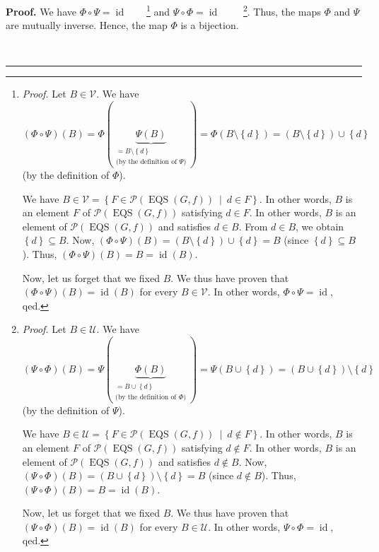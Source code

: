 \documentclass[numbers=enddot,12pt,final,onecolumn,notitlepage]{scrartcl}%
\theoremstyle{definition}
\newenvironment{proof}[1][Proof]{\noindent\textbf{#1.} }{\ \rule{0.5em}{0.5em}}
\newenvironment{verlong}{}{}
\begin{document}
\begin{proof}
\begin{verlong}
We have $\Phi\circ\Psi=\operatorname*{id}$\ \ \ \ \footnote{\textit{Proof.}
Let $B\in\mathcal{V}$. We have%
\[
\left(  \Phi\circ\Psi\right)  \left(  B\right)  =\Phi\left(  \underbrace{\Psi
\left(  B\right)  }_{\substack{=B\setminus\left\{  d\right\}  \\\text{(by the
definition of }\Psi\text{)}}}\right)  =\Phi\left(  B\setminus\left\{
d\right\}  \right)  =\left(  B\setminus\left\{  d\right\}  \right)
\cup\left\{  d\right\}
\]
(by the definition of $\Phi$).
\par
We have $B\in\mathcal{V}=\left\{  F\in\mathcal{P}\left(  \operatorname*{EQS}%
\left(  G,f\right)  \right)  \ \mid\ d\in F\right\}  $. In other words, $B$ is
an element $F$ of $\mathcal{P}\left(  \operatorname*{EQS}\left(  G,f\right)
\right)  $ satisfying $d\in F$. In other words, $B$ is an element of
$\mathcal{P}\left(  \operatorname*{EQS}\left(  G,f\right)  \right)  $ and
satisfies $d\in B$. From $d\in B$, we obtain $\left\{  d\right\}  \subseteq
B$. Now, $\left(  \Phi\circ\Psi\right)  \left(  B\right)  =\left(
B\setminus\left\{  d\right\}  \right)  \cup\left\{  d\right\}  =B$ (since
$\left\{  d\right\}  \subseteq B$). Thus, $\left(  \Phi\circ\Psi\right)
\left(  B\right)  =B=\operatorname*{id}\left(  B\right)  $.
\par
Now, let us forget that we fixed $B$. We thus have proven that $\left(
\Phi\circ\Psi\right)  \left(  B\right)  =\operatorname*{id}\left(  B\right)  $
for every $B\in\mathcal{V}$. In other words, $\Phi\circ\Psi=\operatorname*{id}%
$, qed.} and $\Psi\circ\Phi=\operatorname*{id}$%
\ \ \ \ \footnote{\textit{Proof.} Let $B\in\mathcal{U}$. We have%
\[
\left(  \Psi\circ\Phi\right)  \left(  B\right)  =\Psi\left(  \underbrace{\Phi
\left(  B\right)  }_{\substack{=B\cup\left\{  d\right\}  \\\text{(by the
definition of }\Phi\text{)}}}\right)  =\Psi\left(  B\cup\left\{  d\right\}
\right)  =\left(  B\cup\left\{  d\right\}  \right)  \setminus\left\{
d\right\}
\]
(by the definition of $\Psi$).
\par
We have $B\in\mathcal{U}=\left\{  F\in\mathcal{P}\left(  \operatorname*{EQS}%
\left(  G,f\right)  \right)  \ \mid\ d\notin F\right\}  $. In other words, $B$
is an element $F$ of $\mathcal{P}\left(  \operatorname*{EQS}\left(
G,f\right)  \right)  $ satisfying $d\notin F$. In other words, $B$ is an
element of $\mathcal{P}\left(  \operatorname*{EQS}\left(  G,f\right)  \right)
$ and satisfies $d\notin B$. Now, $\left(  \Psi\circ\Phi\right)  \left(
B\right)  =\left(  B\cup\left\{  d\right\}  \right)  \setminus\left\{
d\right\}  =B$ (since $d\notin B$). Thus, $\left(  \Psi\circ\Phi\right)
\left(  B\right)  =B=\operatorname*{id}\left(  B\right)  $.
\par
Now, let us forget that we fixed $B$. We thus have proven that $\left(
\Psi\circ\Phi\right)  \left(  B\right)  =\operatorname*{id}\left(  B\right)  $
for every $B\in\mathcal{U}$. In other words, $\Psi\circ\Phi=\operatorname*{id}%
$, qed.}. Thus, the maps $\Phi$ and $\Psi$ are mutually inverse. Hence, the
map $\Phi$ is a bijection.


\end{verlong}
\end{proof}
\end{document}
